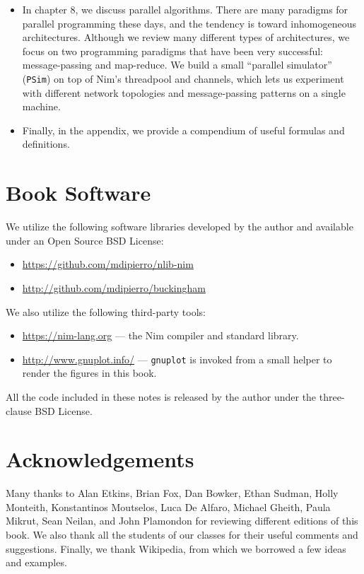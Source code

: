 \documentclass[justified, sixbynine]{tufte-book}
\def\ft{\small\tt}
\theoremstyle{plain}%
\newtheorem * {corollary}{Corollary}
\theoremstyle{definition}
\theoremstyle{remark}
\newtheorem * {remark}{Remark}
\newtheorem * {note}{Note}
\begin{document}
\begin{fullwidth}
\begin{itemize}
\item In chapter 8, we discuss parallel algorithms. There are many paradigms for parallel programming these days, and the tendency is toward inhomogeneous architectures. Although we review many different types of architectures, we focus on two programming paradigms that have been very successful: message-passing and map-reduce. We build a small ``parallel simulator'' ({\ft PSim}) on top of Nim's threadpool and channels, which lets us experiment with different network topologies and message-passing patterns on a single machine.

\item Finally, in the appendix, we provide a compendium of useful formulas and definitions.
\end{itemize}

\section{Book Software}

We utilize the following software libraries developed by the author and available under an Open Source BSD License:

\begin{itemize}
\item \url{https://github.com/mdipierro/nlib-nim}
\item \url{http://github.com/mdipierro/buckingham}
\end{itemize}

We also utilize the following third-party tools:

\begin{itemize}
\item \url{https://nim-lang.org} --- the Nim compiler and standard library.
\item \url{http://www.gnuplot.info/} --- {\ft gnuplot} is invoked from a small helper to render the figures in this book.
\end{itemize}

All the code included in these notes is released by the author under the three-clause BSD License.

\section * {Acknowledgements}

Many thanks to Alan Etkins, Brian Fox, Dan Bowker, Ethan Sudman, Holly Monteith, Konstantinos Moutselos, Luca De Alfaro, Michael Gheith, Paula Mikrut, Sean Neilan, and John Plamondon for reviewing different editions of this book. We also thank all the students of our classes for their useful comments and suggestions. Finally, we thank Wikipedia, from which we borrowed a few ideas and examples.


\end{fullwidth}
\end{document}
